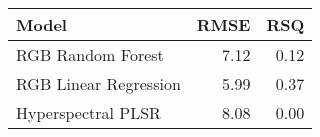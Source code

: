 \captionsetup[table]{labelformat=empty,skip=1pt}
\begin{longtable}{lrr}
\toprule
Model & RMSE & RSQ \\ 
\midrule
RGB Random Forest & 7.12 & 0.12 \\ 
RGB Linear Regression & 5.99 & 0.37 \\ 
Hyperspectral PLSR & 8.08 & 0.00 \\ 
\bottomrule
\end{longtable}

